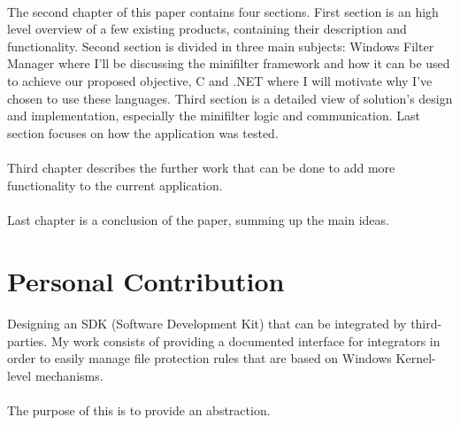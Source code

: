 	\paragraph{}
	The second chapter of this paper contains four sections. First section is an high level overview of a few existing products, containing their description and functionality. Second section is divided in three main subjects: Windows Filter Manager where I'll be discussing the minifilter framework and how it can be used to achieve our proposed objective, C and .NET where I will motivate why I've chosen to use these languages. Third section is a detailed view of solution's design and implementation, especially the minifilter logic and communication. Last section focuses on how the application was tested.
	
	\paragraph{}
	Third chapter describes the further work that can be done to add more functionality to the current application. 
	
	\paragraph{}
	Last chapter is a conclusion of the paper, summing up the main ideas.
		
	\section{Personal Contribution}
	\paragraph{}
	Designing an SDK (Software Development Kit) that can be integrated by third-parties. My work consists of providing a documented interface for integrators in order to easily manage file protection rules that are based on Windows Kernel-level mechanisms.
	
	\paragraph{}
	The purpose of this is to provide an abstraction.
	
	